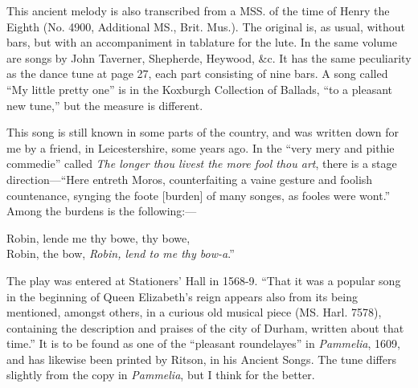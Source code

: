 
This ancient melody is also transcribed from a MSS. of the time of Henry the
Eighth (No. 4900, Additional MS., Brit. Mus.). The original is, as usual, without
bars, but with an accompaniment in tablature for the lute. In the same
volume are songs by John Taverner, Shepherde, Heywood, \&c. It has the same
peculiarity as the dance tune at page 27, each part consisting of nine bars. A
song called “My little pretty one” is in the Koxburgh Collection of Ballads,
“to a pleasant new tune,” but the measure is different.



This song is still known in some parts of the country, and was written down for
me by a friend, in Leicestershire, some years ago. In the “very mery and pithie
commedie” called \textit{The longer thou livest the more fool thou art}, there is a
stage direction—“Here entreth Moros, counterfaiting a vaine gesture and foolish
countenance, synging the foote [burden] of many songes, as fooles were wont.”
Among the burdens is the following:—

\begin{scverse}
Robin, lende me thy bowe, thy bowe,\\
Robin, the bow, \textit{Robin, lend to me thy bow-a}.”
\end{scverse}
\pagebreak

The play was entered at Stationers’ Hall in 1568-9. “That it was a popular
song in the beginning of Queen Elizabeth’s reign appears also from its being
mentioned, amongst others, in a curious old musical piece (MS. Harl. 7578),
containing the description and praises of the city of Durham, written about that
time.” It is to be found as one of the “pleasant roundelayes” in \textit{Pammelia},
1609, and has likewise been printed by Ritson, in his Ancient Songs. The tune
differs slightly from the copy in \textit{Pammelia}, but I think for the better.





